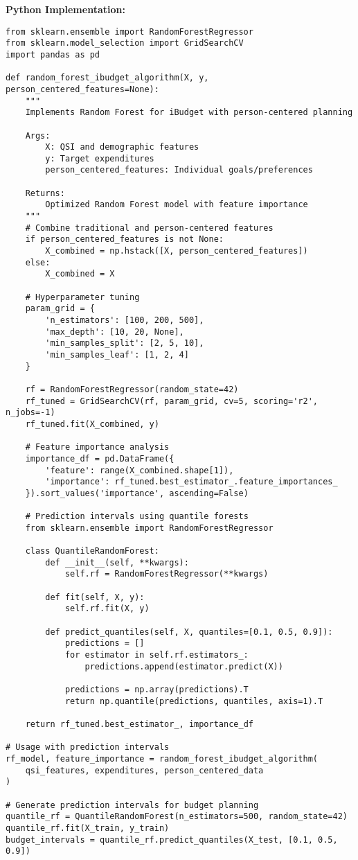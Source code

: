 \documentclass[12pt]{article}
\begin{document}
\textbf{Python Implementation:}
\begin{lstlisting}
from sklearn.ensemble import RandomForestRegressor
from sklearn.model_selection import GridSearchCV
import pandas as pd

def random_forest_ibudget_algorithm(X, y, person_centered_features=None):
    """
    Implements Random Forest for iBudget with person-centered planning
    
    Args:
        X: QSI and demographic features
        y: Target expenditures
        person_centered_features: Individual goals/preferences
    
    Returns:
        Optimized Random Forest model with feature importance
    """
    # Combine traditional and person-centered features
    if person_centered_features is not None:
        X_combined = np.hstack([X, person_centered_features])
    else:
        X_combined = X
    
    # Hyperparameter tuning
    param_grid = {
        'n_estimators': [100, 200, 500],
        'max_depth': [10, 20, None],
        'min_samples_split': [2, 5, 10],
        'min_samples_leaf': [1, 2, 4]
    }
    
    rf = RandomForestRegressor(random_state=42)
    rf_tuned = GridSearchCV(rf, param_grid, cv=5, scoring='r2', n_jobs=-1)
    rf_tuned.fit(X_combined, y)
    
    # Feature importance analysis
    importance_df = pd.DataFrame({
        'feature': range(X_combined.shape[1]),
        'importance': rf_tuned.best_estimator_.feature_importances_
    }).sort_values('importance', ascending=False)
    
    # Prediction intervals using quantile forests
    from sklearn.ensemble import RandomForestRegressor
    
    class QuantileRandomForest:
        def __init__(self, **kwargs):
            self.rf = RandomForestRegressor(**kwargs)
            
        def fit(self, X, y):
            self.rf.fit(X, y)
            
        def predict_quantiles(self, X, quantiles=[0.1, 0.5, 0.9]):
            predictions = []
            for estimator in self.rf.estimators_:
                predictions.append(estimator.predict(X))
            
            predictions = np.array(predictions).T
            return np.quantile(predictions, quantiles, axis=1).T
    
    return rf_tuned.best_estimator_, importance_df

# Usage with prediction intervals
rf_model, feature_importance = random_forest_ibudget_algorithm(
    qsi_features, expenditures, person_centered_data
)

# Generate prediction intervals for budget planning
quantile_rf = QuantileRandomForest(n_estimators=500, random_state=42)
quantile_rf.fit(X_train, y_train)
budget_intervals = quantile_rf.predict_quantiles(X_test, [0.1, 0.5, 0.9])
\end{lstlisting}
\end{document}
